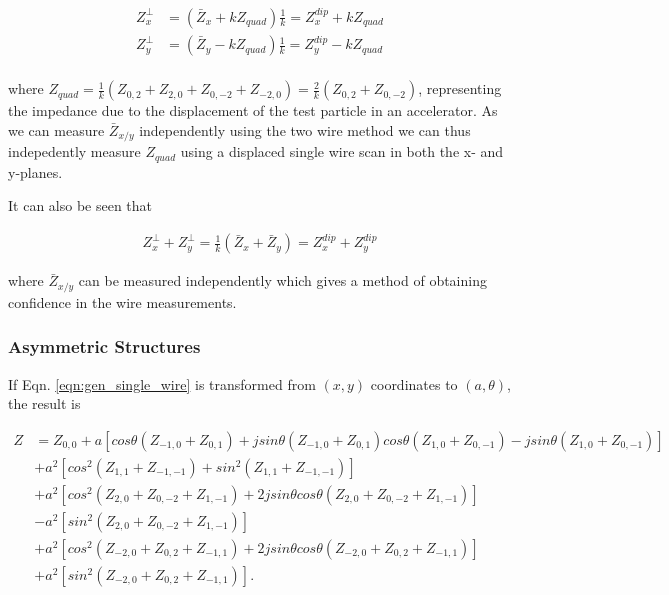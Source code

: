 \documentclass[review, number, sort&compress]{elsarticle}
\begin{document}
\begin{align}
Z^{\perp}_{x} & = \left( \bar{Z}_{x} + kZ_{quad} \right)\frac{1}{k} =  Z^{dip}_{x} + kZ_{quad}\\
Z^{\perp}_{y} & = \left( \bar{Z}_{y} - kZ_{quad} \right)\frac{1}{k}= Z^{dip}_{y} - kZ_{quad} \\
\end{align}

where $Z_{quad}=\frac{1}{k}\left( Z_{0,2}+Z_{2,0}+Z_{0,-2}+Z_{-2,0}  \right) = \frac{2}{k}\left( Z_{0,2}+Z_{0,-2}  \right)$, representing the impedance due to the displacement of the test particle in an accelerator. As we can measure $\bar{Z}_{x/y}$ independently using the two wire method we can thus indepedently measure $Z_{quad}$ using a displaced single wire scan in both the x- and y-planes.

It can also be seen that

\begin{align}
Z^{\perp}_{x} + Z^{\perp}_{y} = \frac{1}{k}\left( \bar{Z}_{x} + \bar{Z}_{y} \right) = Z^{dip}_{x} + Z^{dip}_{y}
\end{align}

where $\bar{Z}_{x/y}$ can be measured independently which gives a method of obtaining confidence in the wire measurements.

\subsubsection{Asymmetric Structures}

If Eqn. \ref{eqn:gen_single_wire} is transformed from $\left( x,y \right)$ coordinates to $\left( a, \theta \right)$, the result is

\begin{align}
Z &=Z_{0,0} +a\left[ cos\theta \left( Z_{-1,0} + Z_{0,1} \right) +jsin\theta \left( Z_{-1,0} + Z_{0,1} \right)  cos\theta \left( Z_{1,0} + Z_{0,-1} \right) - jsin\theta \left( Z_{1,0} + Z_{0,-1} \right)\right] \nonumber \\
   &+a^{2}\left[ cos^{2} \left( Z_{1,1} + Z_{-1,-1} \right) + sin^{2} \left( Z_{1,1} + Z_{-1,-1} \right)\right] \nonumber \\
   &+a^{2}\left[ cos^{2} \left( Z_{2,0} + Z_{0,-2} +Z_{1,-1} \right) +2jsin\theta cos\theta\left( Z_{2,0} + Z_{0,-2} +Z_{1,-1} \right) \right] \nonumber \\
   & - a^{2}\left[sin^{2} \left( Z_{2,0} + Z_{0,-2} +Z_{1,-1} \right)\right] \nonumber  \\
   &+ a^{2}\left[ cos^{2} \left( Z_{-2,0} + Z_{0,2} +Z_{-1,1} \right) +2jsin\theta cos\theta\left( Z_{-2,0} + Z_{0,2} +Z_{-1,1}  \right) \right] \nonumber \\
   &+ a^{2}\left[sin^{2} \left( Z_{-2,0} + Z_{0,2} +Z_{-1,1}  \right) \right].
\end{align}
\end{document}
